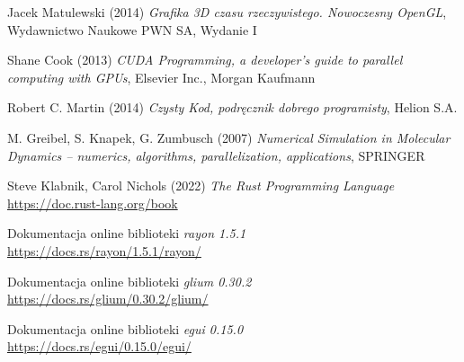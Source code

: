\documentclass[12pt, letterpaper]{report}
\begin{document}
    \begin{thebibliography}{9}

        Jacek Matulewski (2014) 
        \emph{Grafika 3D czasu rzeczywistego. Nowoczesny OpenGL},
        Wydawnictwo Naukowe PWN SA, Wydanie I

        Shane Cook (2013) 
        \emph{CUDA Programming, a developer's guide to parallel computing with GPUs},
        Elsevier Inc., Morgan Kaufmann

        Robert C. Martin (2014) 
        \emph{Czysty Kod, podręcznik dobrego programisty},
        Helion S.A.

        M. Greibel, S. Knapek, G. Zumbusch (2007)
        \emph{
            Numerical Simulation in Molecular Dynamics – 
            numerics, algorithms, parallelization, applications},
        SPRINGER

        Steve Klabnik, Carol Nichols (2022)
        \emph{The Rust Programming Language} \\
        \url{https://doc.rust-lang.org/book}

        Dokumentacja online biblioteki \emph{rayon 1.5.1} \\
        \url{https://docs.rs/rayon/1.5.1/rayon/}

        Dokumentacja online biblioteki \emph{glium 0.30.2} \\
        \url{https://docs.rs/glium/0.30.2/glium/}

        Dokumentacja online biblioteki \emph{egui 0.15.0} \\
        \url{https://docs.rs/egui/0.15.0/egui/}

    \end{thebibliography}
\end{document}
